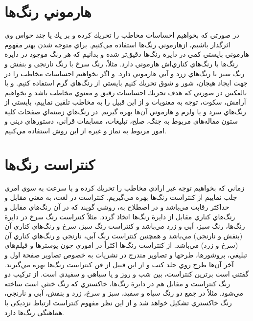 \documentclass[12pt]{report}
\begin{document}
\section{هارموني رنگ‌ها}
در صورتي كه بخواهيم احساسات مخاطب را تحريك كرده و بر يك يا چند حواس وي اثرگذار باشیم، از‌هارموني رنگ‌ها استفاده مي‌كنيم. براي متوجه شدن بهتر مفهوم هارموني بايستي كمي در دايرة رنگ‌ها دقيق‌تر شده و بدانيم كه هر رنگ موجود در دايرة رنگ‌ها با رنگ‌هاي كناري‌اش‌ هارموني دارد.
مثلاً، رنگ سرخ با رنگ نارنجي و بنفش و رنگ سبز با رنگ‌هاي زرد و آبي‌ هارموني دارد. و اگر بخواهيم احساسات مخاطب را در جهت ايجاد هيجان، شور و شوق تحريك كنيم بايستي از رنگ‌هاي گرم استفاده كنيم. و يا بالعكس در صورتي كه هدف تحريك احساسات رقيق و معنوي مخاطب باشد و بخواهيم آرامش، سكوت، توجه به معنويات و از اين قبيل را به مخاطب تلقين نماييم، بايستي از رنگ‌هاي سرد و يا ولرم و‌ هارموني آن‌ها بهره گيريم. در رنگ‌هاي زمينه‌اي صفحات كلية ستون مقاله‌هاي مربوط به جنگ، صلح، تبليغات، مسابقات قرآني، دستورهاي ديني و امور مربوط به نماز و غيره از اين روش استفاده مي‌كنيم.

\section{كنتراست رنگ‌ها}
زماني كه بخواهيم توجه غير ارادي مخاطب را تحريك كرده و با سرعت به سوي امري جلب نماييم از كنتراست رنگ‌ها بهره مي‌گيريم. كنتراست در لغت، به معني مقابل و حداكثر رقابت مي‌باشد و در اصطلاح به، روشي گويند كه در آن رنگ‌هاي مقابل و رنگ‌هاي كناري مقابل از دايرة رنگ‌ها اتخاذ گردد. مثلاً كنتراست رنگ سرخ در دايرة رنگ‌ها، رنگ سبز، آبي و زرد مي‌باشد و كنتراست رنگ سبز، سرخ و رنگ‌هاي كناري آن (بنفش و نارنجي) مي‌باشد و همچنين كنتراست رنگ آبي، نارنجي و رنگ‌هاي كناري آن (سرخ و زرد) مي‌باشد. از كنتراست رنگ‌ها اكثراً در اموري چون پوسترها و فيلم‌هاي تبليغي، بروشورها، طرحها و تصاوير مندرج در نشريات به خصوص تصاوير صفحة اول و آخر آن‌ها طرح روي جلد كتب و از اين قبيل از فن كنتراست رنگ‌ها بهره مي‌گيرند. گفتني است برترين كنتراست، بين شب و روز و يا سياهي و سفيدي است. از تركيب دو رنگ كنتراست و مقابل هم در دايرة رنگ‌ها، خاكستري كه رنگ خنثي است ساخته مي‌شود. مثلاً در جمع دو رنگ سياه و سفيد، سبز و سرخ، زرد و بنفش، آبي و نارنجي، رنگ خاكستري
تشكيل خواهد شد و از این نظر مفهوم کنتراست ارتباط نزدیکی با هماهنگی رنگ‌ها دارد.
\end{document}
